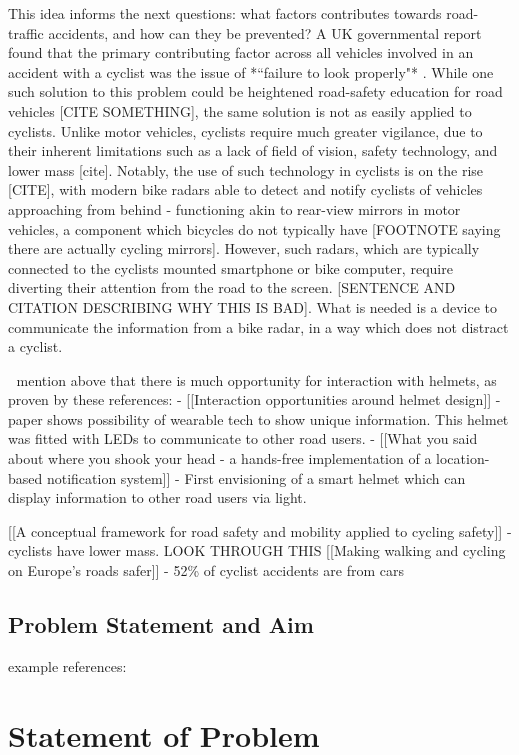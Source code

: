 \documentclass{interim}
\begin{document}
This idea informs the next questions: what factors contributes towards road-traffic accidents, and how can they be prevented? A UK governmental report found that the primary contributing factor across all vehicles involved in an accident with a cyclist was the issue of *“failure to look properly"* \cite{factsonpedalcyclists}. While one such solution to this problem could be heightened road-safety education for road vehicles [CITE SOMETHING], the same solution is not as easily applied to cyclists. Unlike motor vehicles, cyclists require much greater vigilance, due to their inherent limitations such as a lack of field of vision, safety technology, and lower mass [cite]. Notably, the use of such technology in cyclists is on the rise [CITE], with modern bike radars able to detect and notify cyclists of vehicles approaching from behind - functioning akin to rear-view mirrors in motor vehicles, a component which bicycles do not typically have [FOOTNOTE saying there are actually cycling mirrors]. However, such radars, which are typically connected to the cyclists mounted smartphone or bike computer, require diverting their attention from the road to the screen. [SENTENCE AND CITATION DESCRIBING WHY THIS IS BAD]. What is needed is a device to communicate the information from a bike radar, in a way which does not distract a cyclist.

^^^
mention above that there is much opportunity for interaction with helmets, as proven by these references:
- [[Interaction opportunities around helmet design]] - paper shows possibility of wearable tech to show unique information. This helmet was fitted with LEDs to communicate to other road users.
- [[What you said about where you shook your head - a hands-free implementation of a location-based notification system]] - First envisioning of a smart helmet which can display information to other road users via light.

[[A conceptual framework for road safety and mobility applied to cycling safety]] - cyclists have lower mass. LOOK THROUGH THIS
[[Making walking and cycling on Europe's roads safer]] - 52\% of cyclist accidents are from cars

\subsection{Problem Statement and Aim}

example references: \cite{BK08}

\section{Statement of Problem}
\end{document}
